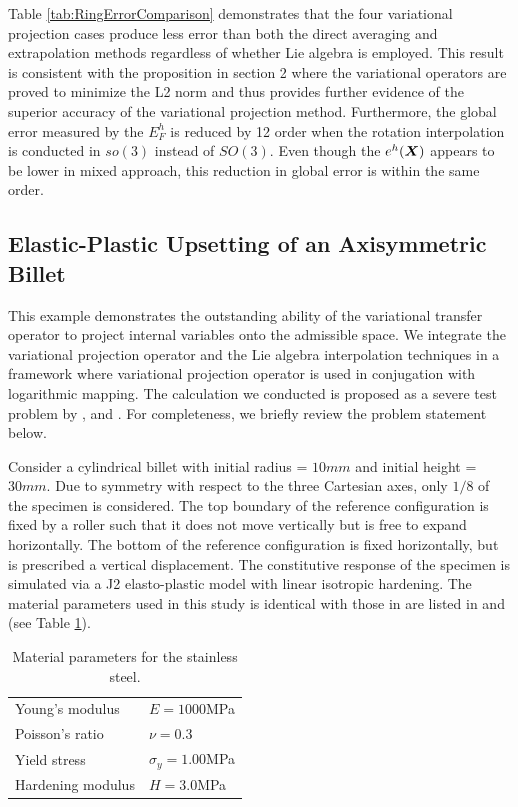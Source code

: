 \documentclass[12pt]{article}
\begin{document}
Table \ref{tab:RingErrorComparison} demonstrates that the four variational 
projection cases produce less error than both the direct averaging and 
extrapolation methods regardless of whether Lie algebra is employed. 
This result is consistent with the proposition in section 2 where the 
variational operators are proved to minimize the L2 norm and thus 
provides further evidence of the superior accuracy of the variational 
projection method. Furthermore, the global error measured by the $E^{h}_{F}$ 
is reduced by 12 order when the rotation interpolation is conducted in $so(3)$ 
instead of $SO(3)$. Even though the $e^{h}({\boldsymbol{X}})$ appears to be lower in mixed 
approach, this reduction in global error is within the same order.   


\subsection{Elastic-Plastic Upsetting of an Axisymmetric Billet}
This example demonstrates the outstanding ability of the variational
transfer operator to project internal variables onto the admissible
space. We integrate the variational projection operator and the Lie
algebra interpolation techniques in a framework where variational
projection operator is used in conjugation with logarithmic mapping.
The calculation we conducted is proposed as a severe test problem by
\citet{Krieg.Krieg:1977}, \citet{Taylor.Becker:1983} and
\citet{Simo.Hughes:1998}. For completeness, we briefly review the
problem statement below.

Consider a cylindrical billet with initial radius = $10mm$ and initial
height = $30mm$. Due to symmetry with respect to the three Cartesian
axes, only $1/8$ of the specimen is considered. The top boundary of
the reference configuration is fixed by a roller such that it does not
move vertically but is free to expand horizontally. The bottom of the
reference configuration is fixed horizontally, but is prescribed a
vertical displacement.  The constitutive response of the specimen is
simulated via a J2 elasto-plastic model with linear isotropic
hardening. The material parameters used in this study is identical
with those in are listed in \citep{Taylor.Becker:1983} and
\citep{Simo.Hughes:1998} (see Table \ref{tab:UpsetBillet}).
\begin{table}[htbp]
  \begin{center}
    \begin{tabular}{ l l }
      \toprule
      
      Young's modulus
      &
      $E = 1000$MPa
      \\
      Poisson's ratio
      &
      $\nu = 0.3$
      \\
      Yield stress  
      &
      $\sigma_{y} = 1.00$MPa
      \\
      Hardening modulus   
      &
      $H=3.0$MPa
      \\
      \bottomrule
    \end{tabular}
    \caption{Material parameters for the stainless steel.}
    \label{tab:UpsetBillet}
  \end{center}
\end{table}
\end{document}
